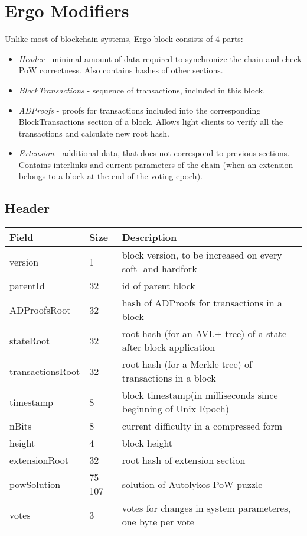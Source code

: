 \section{Ergo Modifiers}


Unlike most of blockchain systems, Ergo block consists of 4 parts:

\begin{itemize}
    \item{\em Header } - minimal amount of data required to synchronize the chain and check PoW correctness.
    Also contains hashes of other sections.
    \item{\em BlockTransactions } - sequence of transactions, included in this block.
    \item{\em ADProofs } - proofs for transactions included into the corresponding BlockTransactions section of a block.
    Allows light clients to verify all the transactions and calculate new root hash.
    \item{\em Extension } - additional data, that does not correspond to previous sections.
    Contains interlinks and current parameters of the chain (when an extension belongs to a block at the end of the
    voting epoch).
\end{itemize}

\subsection{Header}
\vspace{1em}
\begin{tabular}{ |p{2.5cm}||p{0.5cm}|p{7.5cm}|  }
    \hline
    \hline
    Field & Size & Description  \\
    \hline
    version  &  1 &  block version, to be increased on every soft- and hardfork  \\
    \hline
    parentId &  32 &  id of parent block  \\
    \hline
    ADProofsRoot &  32 &  hash of ADProofs for transactions in a block \\
    \hline
    stateRoot &  32 &  root hash (for an AVL+ tree) of a state after block application  \\
    \hline
    transactionsRoot  &  32 &  root hash (for a Merkle tree) of transactions in a block  \\
    \hline
    timestamp &  8 &  block timestamp(in milliseconds since beginning of Unix Epoch)  \\
    \hline
    nBits &  8 & current difficulty in a compressed form  \\
    \hline
    height &  4 & block height  \\
    \hline
    extensionRoot & 32 & root hash of extension section  \\
    \hline
    powSolution & 75-107 & solution of Autolykos PoW puzzle  \\
    \hline
    votes & 3 & votes for changes in system parameteres, one byte per vote  \\
    \hline
\end{tabular}

